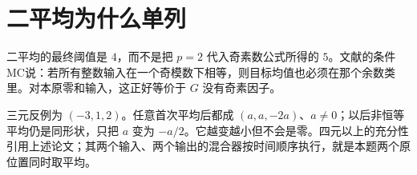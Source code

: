 \section{二平均为什么单列}
二平均的最终阈值是 $4$，而不是把 $p=2$ 代入奇素数公式所得的 $5$。文献\cite{mixing}的条件MC说：若所有整数输入在一个奇模数下相等，则目标均值也必须在那个余数类里。对本原零和输入，这正好等价于 $G$ 没有奇素因子。

三元反例为 $(-3,1,2)$。任意首次平均后都成 $(a,a,-2a)$、$a\ne0$；以后非恒等平均仍是同形状，只把 $a$ 变为 $-a/2$。它越变越小但不会是零。四元以上的充分性引用上述论文；其两个输入、两个输出的混合器按时间顺序执行，就是本题两个原位置同时取平均。
